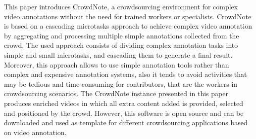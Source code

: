 This paper introduces CrowdNote, a crowdsourcing environment for complex video annotations without the need for trained workers or specialists. CrowdNote is based on a cascading microtasks approach to achieve complex video annotation by aggregating and processing multiple simple annotations collected from the crowd. The used approach consists of dividing complex annotation tasks into simple and small microtasks, and cascading them to generate a final result. Moreover, this approach allows to use simple annotation tools rather than complex and expensive annotation systems, also it tends to avoid activities that may be tedious and time-consuming for contributors, that are the workers in crowdsourcing scenarios. The CrowdNote instance presented in this paper produces enriched videos in which all extra content added is provided, selected and positioned by the crowd. However, this software is open source and can be downloaded and used as template for different crowdsourcing applications based on video annotation.
